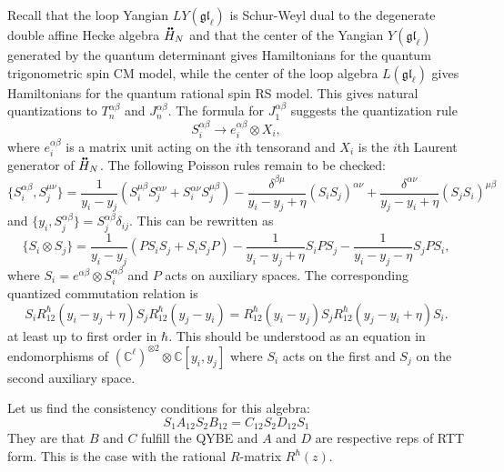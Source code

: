 \documentclass[11pt]{report}
\newcommand*{\ddt}[1]{%
  \accentset{\mbox{\large\bfseries .\hspace{-0.25ex}.}}{#1}}
\theoremstyle{definition}
\theoremstyle{remark}
\theoremstyle{remark}
\newcommand{\C}{\mathbb{C}}
\begin{document}
Recall that the loop Yangian $LY(\mathfrak{gl}_\ell)$ is Schur-Weyl dual to the degenerate double affine Hecke algebra $\ddt H_N$ and that the center of the Yangian $Y(\mathfrak{gl}_\ell)$ generated by the quantum determinant gives Hamiltonians for the quantum trigonometric spin CM model, while the center of the loop algebra $L(\mathfrak{gl}_\ell)$ gives Hamiltonians for the quantum rational spin RS model. This gives natural quantizations to $T_n^{\alpha\beta}$ and $J_n^{\alpha\beta}$. The formula for $J_1^{\alpha\beta}$ suggests the quantization rule
\begin{equation*}
S_i^{\alpha\beta} \to e_i^{\alpha\beta} \otimes X_i,
\end{equation*}
where $e_i^{\alpha\beta}$ is a matrix unit acting on the $i$th tensorand and $X_i$ is the $i$th Laurent generator of $\ddt H_N$. The following Poisson rules remain to be checked:
\begin{equation*}
\{ S_i^{\alpha\beta},S_j^{\mu\nu} \} = \frac{1}{y_i-y_j} (S_i^{\mu\beta} S_j^{\alpha\nu} + S_i^{\alpha\nu} S_j^{\mu\beta}) - \frac{\delta^{\beta\mu}}{y_i-y_j+\eta} (S_iS_j)^{\alpha\nu} + \frac{\delta^{\alpha\nu}}{y_j-y_i+\eta} (S_jS_i)^{\mu\beta} 
\end{equation*}
and $\{ y_i, S_j^{\alpha\beta} \} = S_j^{\alpha\beta} \delta_{ij}$. This can be rewritten as
\begin{equation*}
\{ S_i \otimes S_j \} = \frac{1}{y_i-y_j} (P S_i S_j + S_i S_j P) - \frac{1}{y_i-y_j+\eta} S_i P S_j - \frac{1}{y_i-y_j-\eta} S_j P S_i,
\end{equation*}
where $S_i = e^{\alpha\beta} \otimes S_i^{\alpha\beta}$ and $P$ acts on auxiliary spaces. The corresponding quantized commutation relation is
\begin{equation*}
S_i R_{12}^\hbar(y_i-y_j+\eta) S_j R_{12}^\hbar(y_j-y_i) = R_{12}^\hbar(y_i-y_j) S_j R_{12}^\hbar(y_j-y_i+\eta) S_i.
\end{equation*}
at least up to first order in $\hbar$. This should be understood as an equation in endomorphisms of $(\C^\ell)^{\otimes 2} \otimes \C[y_i,y_j]$ where $S_i$ acts on the first and $S_j$ on the second auxiliary space.

Let us find the consistency conditions for this algebra:
\begin{equation*}
S_1 A_{12} S_2 B_{12} = C_{12} S_2 D_{12} S_1
\end{equation*}
They are that $B$ and $C$ fulfill the QYBE and $A$ and $D$ are respective reps of RTT form. This is the case with the rational $R$-matrix $R^\hbar(z)$.
\end{document}
